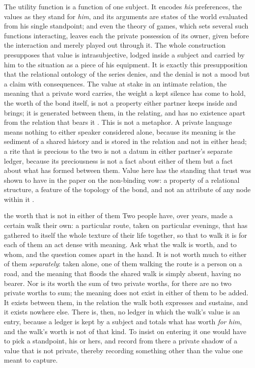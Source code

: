 The utility function is a function of one subject. It encodes \emph{his} preferences, the values as they stand for \emph{him}, and its arguments are states of the world evaluated from his single standpoint; and even the theory of games, which sets several such functions interacting, leaves each the private possession of its owner, given before the interaction and merely played out through it. The whole construction presupposes that value is intrasubjective, lodged inside a subject and carried by him to the situation as a piece of his equipment. It is exactly this presupposition that the relational ontology of the series denies, and the denial is not a mood but a claim with consequences. The value at stake in an intimate relation, the meaning that a private word carries, the weight a kept silence has come to hold, the worth of the bond itself, is not a property either partner keeps inside and brings; it is generated between them, in the relating, and has no existence apart from the relation that bears it \parencite{paperxxiv,paperxiii}. This is not a metaphor. A private language means nothing to either speaker considered alone, because its meaning is the sediment of a shared history and is stored in the relation and not in either head; a rite that is precious to the two is not a datum in either partner's separate ledger, because its preciousness is not a fact about either of them but a fact about what has formed between them. Value here has the standing that trust was shown to have in the paper on the non-binding vow: a property of a relational structure, a feature of the topology of the bond, and not an attribute of any node within it \parencite{paperxiii}.

\begin{casebox}{the worth that is not in either of them}
Two people have, over years, made a certain walk their own: a particular route, taken on particular evenings, that has gathered to itself the whole texture of their life together, so that to walk it is for each of them an act dense with meaning. Ask what the walk is worth, and to whom, and the question comes apart in the hand. It is not worth much to either of them \emph{separately}: taken alone, one of them walking the route is a person on a road, and the meaning that floods the shared walk is simply absent, having no bearer. Nor is its worth the sum of two private worths, for there are no two private worths to sum; the meaning does not exist in either of them to be added. It exists between them, in the relation the walk both expresses and sustains, and it exists nowhere else. There is, then, no ledger in which the walk's value is an entry, because a ledger is kept by a subject and totals what has worth \emph{for him}, and the walk's worth is not of that kind. To insist on entering it one would have to pick a standpoint, his or hers, and record from there a private shadow of a value that is not private, thereby recording something other than the value one meant to capture.
\end{casebox}

